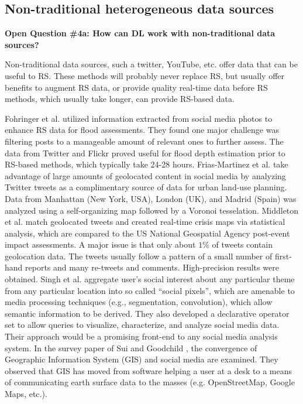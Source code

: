 \documentclass[12pt]{spieman}
\begin{document}
\begin{spacing}{1}
\subsection{Non-traditional heterogeneous data sources}
\label{subsec:ChallengesOpportunities_iv} \textbf{Open Question \#4a: How can DL work with non-traditional data sources?}

Non-traditional data sources, such a twitter, YouTube, etc. offer data that can be useful to RS. These methods will probably never replace RS, but usually offer benefits to augment RS data, or provide quality real-time data before RS methods, which usually take longer, can provide RS-based data.

Fohringer et al. \cite{Fohringer2015NonTraditional} utilized information extracted from social media photos to enhance RS data for flood assessments. They found one major challenge was filtering posts to a manageable amount of relevant ones to further assess. The data from Twitter and Flickr proved useful for flood depth estimation prior to RS-based methods, which typically take 24-28 hours. Frias-Martinez et al. \cite{Frias-Martinez2014Spectral} take advantage of large amounts of geolocated content in social media by analyzing Twitter tweets as a complimentary source of data for urban land-use planning. Data from Manhattan (New York, USA), London (UK), and Madrid (Spain) was analyzed using a self-organizing map \cite{kohonen1998self} followed by a Voronoi tesselation. Middleton et al. \cite{middleton2014real} match geolocated tweets and created real-time crisis maps via statistical analysis, which are compared to the US National Geospatial Agency post-event impact assessments. A major issue is that only about $1\%$ of tweets contain geolocation data. The tweets usually follow a pattern of a small number of first-hand reports and many re-tweets and comments. High-precision results were obtained. Singh et al. \cite{Singh2010Social} aggregate user's social interest about any particular theme from any particular location into so called ``social pixels'', which are amenable to media processing techniques (e.g., segmentation, convolution), which allow semantic information to be derived. They also developed a declarative operator set to allow queries to visualize, characterize, and analyze social media data. Their approach would be a promising front-end to any social media analysis system. In the survey paper of Sui and Goodchild \cite{Sui2011Convergence} , the convergence of Geographic Information System (GIS) and social media are examined. They observed that GIS has moved from software helping a user at a desk to a means of communicating earth surface data to the masses (e.g. OpenStreetMap, Google Maps, etc.).


\end{spacing}
\end{document}
